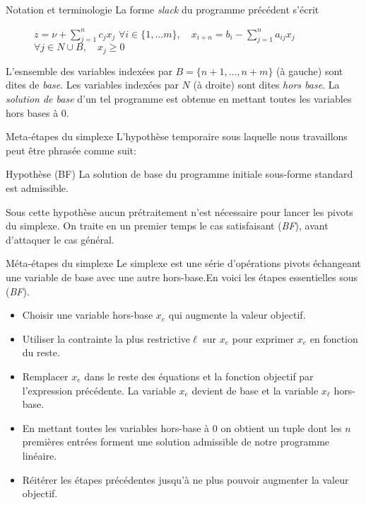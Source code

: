 \documentclass[aspectratio = 169]{beamer}
\begin{document}
\begin{frame}{Notation et terminologie}
  La forme \textit{slack} du programme précédent s'écrit
  \begin{figure}
    \begin{linearProgG}{
        ${\displaystyle z = \nu + \sum_{j=1}^n c_jx_j}$
      }{
        ${\displaystyle \forall i \in \{1, \ldots m \}, \quad x_{i + n} = b_i - \sum_{j=1}^n a_{ij}x_j}$
      }{
        $\forall j \in N\cup B, \quad x_j \geq 0$
      }
    \end{linearProgG}
  \end{figure}
  L'esnsemble des variables indexées par
  $B = \{n + 1, \ldots, n + m \}$ (à gauche) sont dites de
  \emph{base}. Les variables indexées par $N$ (à droite) sont dites
  \emph{hors base}. La \emph{solution de base} d'un tel programme est
  obtenue en mettant toutes les variables hors bases à $0$.
\end{frame}

\begin{frame}{Meta-étapes du simplexe}
  L'hypothèse temporaire sous laquelle nous travaillons peut être
  phrasée comme suit:
  \begin{alertblock}{Hypothèse (BF)}
    La solution de base du programme initiale sous-forme standard est
    admissible.
  \end{alertblock}
  Sous cette hypothèse aucun prétraitement n'est nécessaire pour
  lancer les pivots du simplexe. On traite en un premier temps le cas
  satisfaisant (\emph{BF}), avant d'attaquer le cas général.
\end{frame}

\begin{frame}{Méta-étapes du simplexe}
  Le simplexe est une série d'opérations pivots échangeant une
  variable de base avec une autre hors-base.\pause En voici les étapes
  essentielles sous (\emph{BF}).
  \begin{itemize}
  \item<2->[\textbullet] Choisir une variable hors-base $x_e$ qui
    augmente la valeur objectif.
  \item<3->[\textbullet] Utiliser la contrainte la plus
    restrictive$\ell$ sur $x_e$ pour exprimer $x_e$ en fonction du
    reste.
  \item<4->[\textbullet] Remplacer $x_e$ dans le reste des équations
    et la fonction objectif par l'expression précédente. La variable
    $x_e$ devient de base et la variable $x_\ell$ hors-base.
  \item<5->[\textbullet] En mettant toutes les variables hors-base à
    $0$ on obtient un tuple dont les $n$ premières entrées forment une
    solution admissible de notre programme linéaire.
  \item<6->[\textbullet] Réitérer les étapes précédentes jusqu'à ne
    plus pouvoir augmenter la valeur objectif.
  \end{itemize}
\end{frame}
\end{document}
